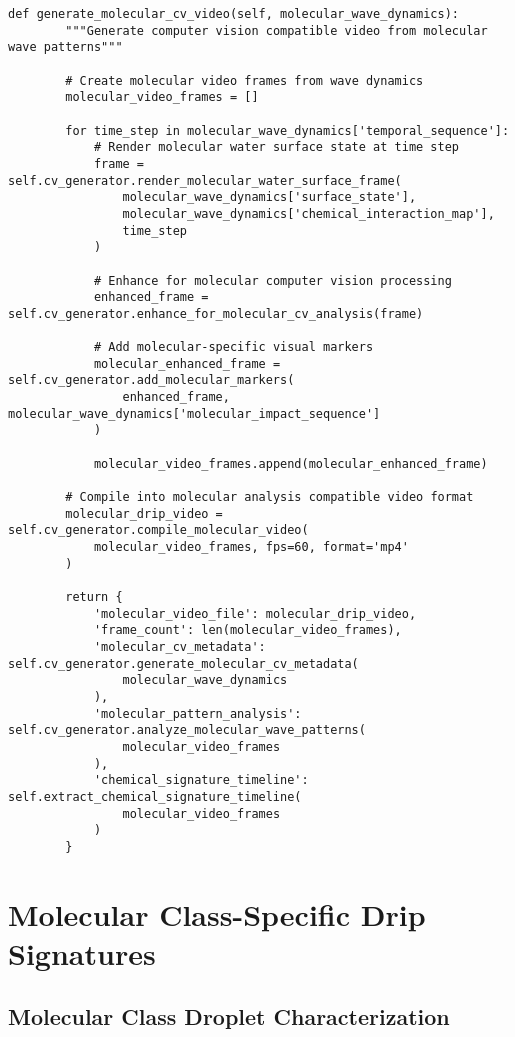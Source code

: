 \documentclass[12pt,a4paper]{article}
\begin{document}
\begin{lstlisting}[style=pythonstyle, caption=Core Ion-to-Drip Implementation for Mass Spectrometry]
    def generate_molecular_cv_video(self, molecular_wave_dynamics):
        """Generate computer vision compatible video from molecular wave patterns"""
        
        # Create molecular video frames from wave dynamics
        molecular_video_frames = []
        
        for time_step in molecular_wave_dynamics['temporal_sequence']:
            # Render molecular water surface state at time step
            frame = self.cv_generator.render_molecular_water_surface_frame(
                molecular_wave_dynamics['surface_state'], 
                molecular_wave_dynamics['chemical_interaction_map'],
                time_step
            )
            
            # Enhance for molecular computer vision processing
            enhanced_frame = self.cv_generator.enhance_for_molecular_cv_analysis(frame)
            
            # Add molecular-specific visual markers
            molecular_enhanced_frame = self.cv_generator.add_molecular_markers(
                enhanced_frame, molecular_wave_dynamics['molecular_impact_sequence']
            )
            
            molecular_video_frames.append(molecular_enhanced_frame)
        
        # Compile into molecular analysis compatible video format
        molecular_drip_video = self.cv_generator.compile_molecular_video(
            molecular_video_frames, fps=60, format='mp4'
        )
        
        return {
            'molecular_video_file': molecular_drip_video,
            'frame_count': len(molecular_video_frames),
            'molecular_cv_metadata': self.cv_generator.generate_molecular_cv_metadata(
                molecular_wave_dynamics
            ),
            'molecular_pattern_analysis': self.cv_generator.analyze_molecular_wave_patterns(
                molecular_video_frames
            ),
            'chemical_signature_timeline': self.extract_chemical_signature_timeline(
                molecular_video_frames
            )
        }
\end{lstlisting}

\section{Molecular Class-Specific Drip Signatures}

\subsection{Molecular Class Droplet Characterization}
\end{document}
